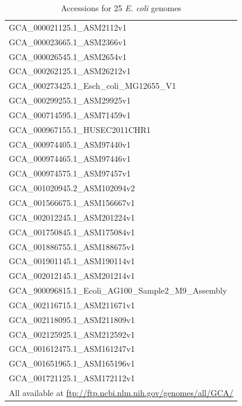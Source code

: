 \documentclass[10pt]{article}
\begin{document}
\begin{table}[!h]
\centering
\caption{Accessions for 25 \textit{E. coli} genomes}
\label{table:accessions}
\begin{tabular}{l}
  \toprule
  GCA\_000021125.1\_ASM2112v1 \\
  GCA\_000023665.1\_ASM2366v1 \\
  GCA\_000026545.1\_ASM2654v1 \\
  GCA\_000262125.1\_ASM26212v1 \\
  GCA\_000273425.1\_Esch\_coli\_MG12655\_V1 \\
  GCA\_000299255.1\_ASM29925v1 \\
  GCA\_000714595.1\_ASM71459v1 \\
  GCA\_000967155.1\_HUSEC2011CHR1 \\
  GCA\_000974405.1\_ASM97440v1 \\
  GCA\_000974465.1\_ASM97446v1 \\
  GCA\_000974575.1\_ASM97457v1 \\
  GCA\_001020945.2\_ASM102094v2 \\
  GCA\_001566675.1\_ASM156667v1 \\
  GCA\_002012245.1\_ASM201224v1 \\
  GCA\_001750845.1\_ASM175084v1 \\
  GCA\_001886755.1\_ASM188675v1 \\
  GCA\_001901145.1\_ASM190114v1 \\
  GCA\_002012145.1\_ASM201214v1 \\
  GCA\_900096815.1\_Ecoli\_AG100\_Sample2\_M9\_Assembly \\
  GCA\_002116715.1\_ASM211671v1 \\
  GCA\_002118095.1\_ASM211809v1 \\
  GCA\_002125925.1\_ASM212592v1 \\
  GCA\_001612475.1\_ASM161247v1 \\
  GCA\_001651965.1\_ASM165196v1 \\
  GCA\_001721125.1\_ASM172112v1\\
  \bottomrule
  {\tiny   All available at \url{ftp://ftp.ncbi.nlm.nih.gov/genomes/all/GCA/}}

\end{tabular}
\end{table}
\end{document}
